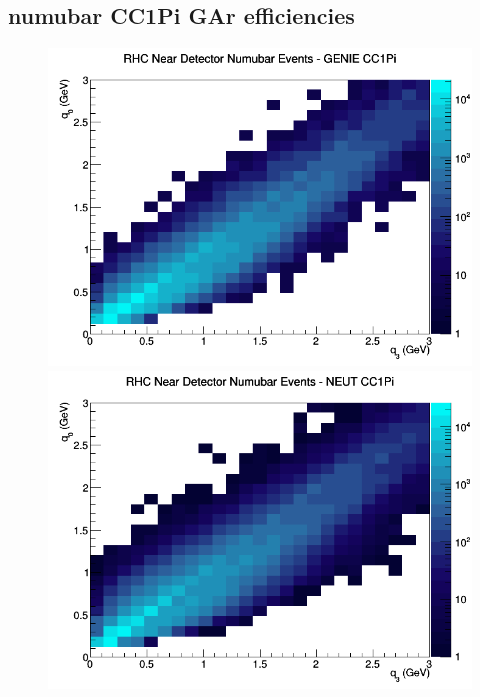 \subsection{numubar CC1Pi GAr efficiencies}
\begin{figure}[h]
\includegraphics[width=\linewidth]{eff_q0_q3/GAr/CC1Pi_RHC_ND_numubar_q3_q0_GENIE.png}
\endminipage
{}
\includegraphics[width=\linewidth]{eff_q0_q3/GAr/CC1Pi_RHC_ND_numubar_q3_q0_NEUT.png}
\endminipage
{}

\end{figure}

